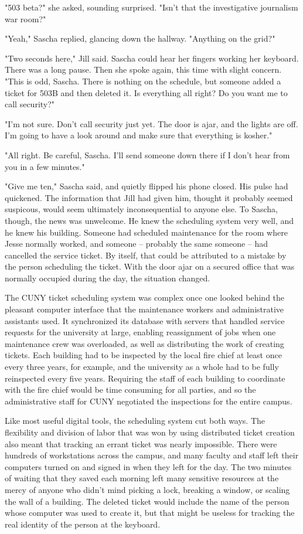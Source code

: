 "503 beta?" she asked, sounding surprised.  "Isn't that the investigative journalism war room?"

"Yeah," Sascha replied, glancing down the hallway.  "Anything on the grid?"

"Two seconds here," Jill said.  Sascha could hear her fingers working her keyboard.  There was a long pause.  Then she spoke again, this time with slight concern.  "This is odd, Sascha.  There is nothing on the schedule, but someone added a ticket for 503B and then deleted it.  Is everything all right?  Do you want me to call security?"

"I'm not sure.  Don't call security just yet.  The door is ajar, and the lights are off.  I'm going to have a look around and make sure that everything is kosher."

"All right.  Be careful, Sascha.  I'll send someone down there if I don't hear from you in a few minutes."

"Give me ten," Sascha said, and quietly flipped his phone closed.  His pulse had quickened.  The information that Jill had given him, thought it probably seemed suspicous, would seem ultimately inconsequential to anyone else.  To Sascha, though, the news was unwelcome.  He knew the scheduling system very well, and he knew his building.  Someone had scheduled maintenance for the room where Jesse normally worked, and someone -- probably the same someone -- had cancelled the service ticket.  By itself, that could be attributed to a mistake by the person scheduling the ticket.  With the door ajar on a secured office that was normally occupied during the day, the situation changed.

The CUNY ticket scheduling system was complex once one looked behind the pleasant computer interface that the maintenance workers and administrative assistants used.  It synchronized its database with servers that handled service requests for the university at large, enabling reassignment of jobs when one maintenance crew was overloaded, as well as distributing the work of creating tickets.  Each building had to be inspected by the local fire chief at least once every three years, for example, and the university as a whole had to be fully reinspected every five years.  Requiring the staff of each building to coordinate with the fire chief would be time consuming for all parties, and so the administrative staff for CUNY negotiated the inspections for the entire campus.

Like most useful digital tools, the scheduling system cut both ways.  The flexibility and division of labor that was won by using distributed ticket creation also meant that tracking an errant ticket was nearly impossible.  There were hundreds of workstations across the campus, and many faculty and staff left their computers turned on and signed in when they left for the day.  The two minutes of waiting that they saved each morning left many sensitive resources at the mercy of anyone who didn't mind picking a lock, breaking a window, or scaling the wall of a building.  The deleted ticket would include the name of the person whose computer was used to create it, but that might be useless for tracking the real identity of the person at the keyboard.


